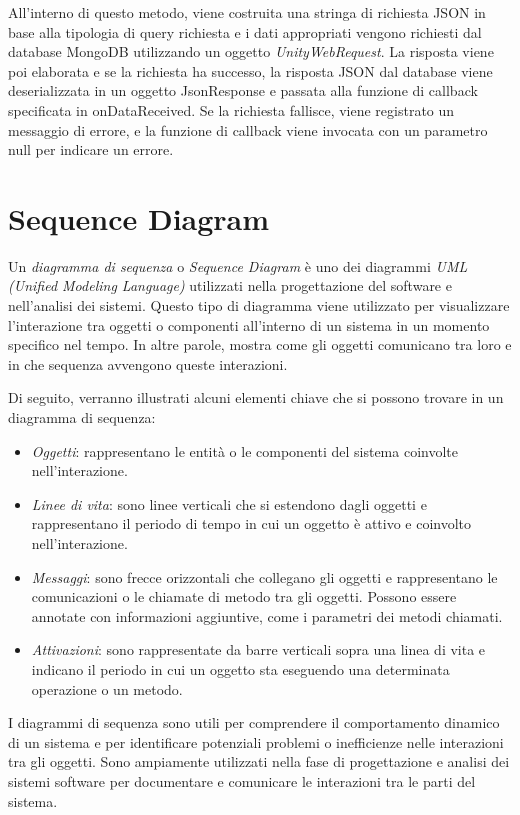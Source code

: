 All'interno di questo metodo, viene costruita una stringa di richiesta JSON in base alla tipologia di query richiesta e i dati appropriati vengono richiesti dal database MongoDB utilizzando un oggetto \textit{UnityWebRequest}. La risposta viene poi elaborata e se la richiesta ha successo, la risposta JSON dal database viene deserializzata in un oggetto JsonResponse e passata alla funzione di callback specificata in onDataReceived. Se la richiesta fallisce, viene registrato un messaggio di errore, e la funzione di callback viene invocata con un parametro null per indicare un errore.

\section{Sequence Diagram}

Un \textit{diagramma di sequenza} o \textit{Sequence Diagram} è uno dei diagrammi \textit{UML (Unified Modeling Language)} utilizzati nella progettazione del software e nell'analisi dei sistemi. Questo tipo di diagramma viene utilizzato per visualizzare l'interazione tra oggetti o componenti all'interno di un sistema in un momento specifico nel tempo. In altre parole, mostra come gli oggetti comunicano tra loro e in che sequenza avvengono queste interazioni.

Di seguito, verranno illustrati alcuni elementi chiave che si possono trovare in un diagramma di sequenza:

\begin{itemize}
    \item \textit{Oggetti}: rappresentano le entità o le componenti del sistema coinvolte nell'interazione.
    \item \textit{Linee di vita}: sono linee verticali che si estendono dagli oggetti e rappresentano il periodo di tempo in cui un oggetto è attivo e coinvolto nell'interazione.
    \item \textit{Messaggi}: sono frecce orizzontali che collegano gli oggetti e rappresentano le comunicazioni o le chiamate di metodo tra gli oggetti. Possono essere annotate con informazioni aggiuntive, come i parametri dei metodi chiamati.
    \item \textit{Attivazioni}: sono rappresentate da barre verticali sopra una linea di vita e indicano il periodo in cui un oggetto sta eseguendo una determinata operazione o un metodo.
\end{itemize}

I diagrammi di sequenza sono utili per comprendere il comportamento dinamico di un sistema e per identificare potenziali problemi o inefficienze nelle interazioni tra gli oggetti. Sono ampiamente utilizzati nella fase di progettazione e analisi dei sistemi software per documentare e comunicare le interazioni tra le parti del sistema.



